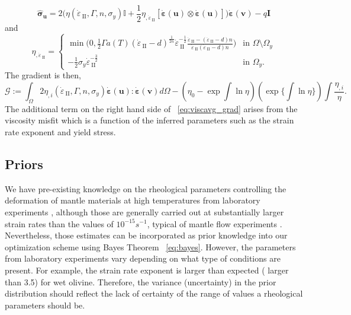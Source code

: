 \documentclass[12pt]{article}
\newcommand{\IIinv}{{\dot\varepsilon}_{\mathrm{\!\!\:II}}}
\newcommand{\uu}{{\ensuremath{\boldsymbol{u}}}}
\newcommand{\vv}{{\ensuremath{\boldsymbol{v}}}}
\newcommand{\ssigma}{{\ensuremath{\boldsymbol{\sigma}}}}
\newcommand{\strain}{{\ensuremath{\dot{\boldsymbol{\varepsilon}}}}}
\begin{document}
\begin{equation}\label{eq:sigma_hat}
\hat\ssigma_\uu  = 2 \Big(\eta(\IIinv,\Gamma, n,
\sigma_y)\mathbb{I}+\frac{1}{2} \eta_{,\IIinv} [\strain(\uu)\otimes
      \strain(\uu)]\Big)\strain(\vv) -q\textbf{I}
\end{equation}
and
\begin{equation}
  \eta_{,\IIinv} \!\!=\!\!
  \begin{cases}
   \min\!\Big(0, \frac{1}{2}\Gamma
   a(T)(\IIinv-d)^{\frac{1}{2n}}\IIinv^{-\frac{1}{2}}\frac{\IIinv-(\IIinv-d)n}{\IIinv(\IIinv-d)n}\Big)
   &\text{in } \Omega\setminus\Omega_y 
   \\
   -\frac{1}{2}\sigma_{y}\IIinv^{-\frac{3}{2}}  &\text{in } \Omega_y.
  \end{cases}
\end{equation}
The gradient is then, 
\begin{equation}
\mathcal G:= \int_{\Omega} 2 \eta_{,i}(\IIinv, \Gamma, n, \sigma_y)\strain(\uu):\strain(\vv) d\Omega - (\eta_0-\exp\int\ln \eta)(\exp\{\int\ln \eta\})\int\frac{\eta_{,i}}{\eta}.\
\label{eq:viscavg_grad}
\end{equation}
The additional term on the right hand side of ~\eqref{eq:viscavg_grad} arises from the viscosity misfit which is a function of the inferred parameters such as the strain rate exponent and yield stress.


\subsection*{Priors}
 We have pre-existing knowledge on the rheological parameters controlling the deformation of mantle materials at high temperatures from laboratory experiments \cite{ranalli1995rheology}, although those are generally carried out at substantially larger strain rates than the values of $10^{-15}s^{-1}$, typical of mantle flow experiments \citep{korenaga2008new}. Nevertheless,  those estimates can be  incorporated as prior knowledge into our optimization scheme using Bayes Theorem ~\eqref{eq:bayes}. However, the parameters from laboratory experiments vary depending on what type of conditions are present. For example, the strain rate exponent is larger than expected ( larger than 3.5) for wet olivine. Therefore, the variance (uncertainty) in the prior distribution should reflect the lack of certainty of the range of values a rheological parameters should be.
\end{document}
